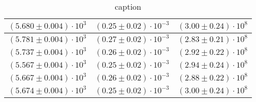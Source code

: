 \begin{table}[H]
\begin{tabular}{|c|c|c|}
        \hline
        $ (5.680 \pm 0.004) \cdot 10^{3} $ & $ (0.25 \pm 0.02) \cdot 10^{-3} $ & $ (3.00 \pm 0.24) \cdot 10^{8} $\\
        \hline
        $ (5.781 \pm 0.004) \cdot 10^{3} $ & $ (0.27 \pm 0.02) \cdot 10^{-3} $ & $ (2.83 \pm 0.21) \cdot 10^{8} $\\
        \hline
        $ (5.737 \pm 0.004) \cdot 10^{3} $ & $ (0.26 \pm 0.02) \cdot 10^{-3} $ & $ (2.92 \pm 0.22) \cdot 10^{8} $\\
        \hline
        $ (5.567 \pm 0.004) \cdot 10^{3} $ & $ (0.25 \pm 0.02) \cdot 10^{-3} $ & $ (2.94 \pm 0.24) \cdot 10^{8} $\\
        \hline
        $ (5.667 \pm 0.004) \cdot 10^{3} $ & $ (0.26 \pm 0.02) \cdot 10^{-3} $ & $ (2.88 \pm 0.22) \cdot 10^{8} $\\
        \hline
        $ (5.674 \pm 0.004) \cdot 10^{3} $ & $ (0.25 \pm 0.02) \cdot 10^{-3} $ & $ (3.00 \pm 0.24) \cdot 10^{8} $\\
        \hline
        \end{tabular}
    \caption{caption }
\end{table}
